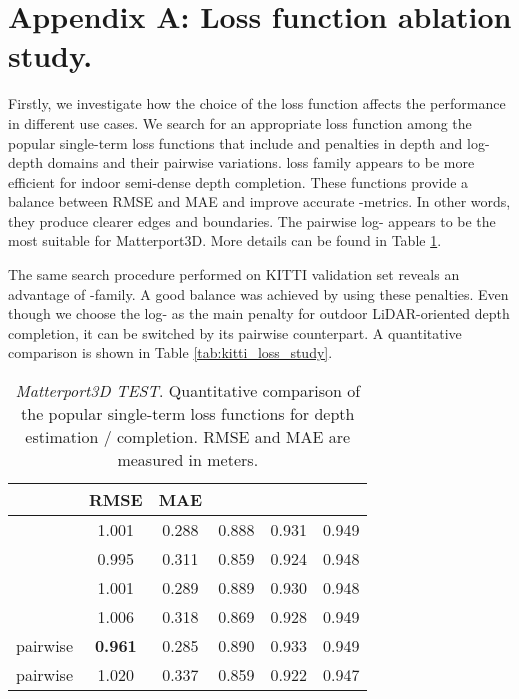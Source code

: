\documentclass[final]{cvpr}
\begin{document}
{\small


}

\section*{Appendix A: Loss function ablation study.}

    Firstly, we investigate how the choice of the loss function affects the performance in different use cases. We search for an appropriate loss function among the popular single-term loss functions that include  and  penalties in depth and log-depth domains and their pairwise variations.  loss family appears to be more efficient for indoor semi-dense depth completion. These functions provide a balance between RMSE and MAE and improve accurate -metrics. In other words, they produce clearer edges and boundaries. The pairwise log- appears to be the most suitable for Matterport3D. More details can be found in Table \ref{tab:mp3d_loss_study}.
    
    The same search procedure performed on KITTI validation set reveals an advantage of -family. A good balance was achieved by using these penalties. Even though we choose the log- as the main penalty for outdoor LiDAR-oriented depth completion, it can be switched by its pairwise counterpart. A quantitative comparison is shown in Table \ref{tab:kitti_loss_study}.
    
    
    \begin{table}[ht]
    \setlength{\tabcolsep}{5pt}
    \renewcommand{\arraystretch}{1.1}
    \centering
    	\begin{tabular}{ c|c|c|c|c|c} 
& RMSE & MAE &  &  & \\
    		\hline
    		\hline
    		 & 1.001 & 0.288 & 0.888 & 0.931 & 0.949  \\
    		 & 0.995 & 0.311 & 0.859 & 0.924 & 0.948 \\
    		 & 1.001 & 0.289 & 0.889 & 0.930 & 0.948 \\
    		 & 1.006 & 0.318 & 0.869 & 0.928 & 0.949 \\
    		pairwise & \textbf{0.961} & 0.285 & 0.890 & 0.933 & 0.949 \\
    		pairwise & 1.020 & 0.337 & 0.859 & 0.922 & 0.947 \\
    		\hline
    
    	\end{tabular}
    	\vspace{0.1cm}
    	\caption{\emph{Matterport3D TEST}. Quantitative comparison of the popular single-term loss functions for depth estimation / completion. RMSE and MAE are measured in meters.}
    	\label{tab:mp3d_loss_study}
    \end{table}
    
\end{document}
